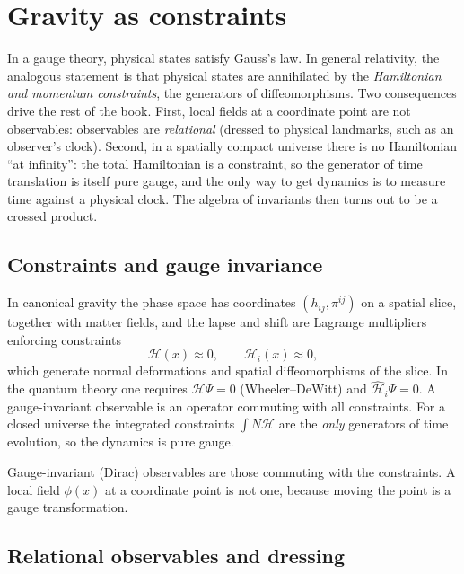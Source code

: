 \chapter{Gravity as constraints}\label{ch:gravity_constraints}

\begin{physmotiv}
In a gauge theory, physical states satisfy Gauss's law. In general relativity, the analogous statement is that physical states are annihilated by the \emph{Hamiltonian and momentum constraints}, the generators of diffeomorphisms. Two consequences drive the rest of the book. First, local fields at a coordinate point are not observables: observables are \emph{relational} (dressed to physical landmarks, such as an observer's clock). Second, in a spatially compact universe there is no Hamiltonian ``at infinity'': the total Hamiltonian is a constraint, so the generator of time translation is itself pure gauge, and the only way to get dynamics is to measure time against a physical clock. The algebra of invariants then turns out to be a crossed product.
\end{physmotiv}

\section{Constraints and gauge invariance}

In canonical gravity the phase space has coordinates $(h_{ij},\pi^{ij})$ on a spatial slice, together with matter fields, and the lapse and shift are Lagrange multipliers enforcing constraints
\begin{equation}
\mathcal H(x)\approx0,\qquad\mathcal H_i(x)\approx0,
\end{equation}
which generate normal deformations and spatial diffeomorphisms of the slice. In the quantum theory one requires $\hat{\mathcal H}\Psi=0$ (Wheeler--DeWitt) and $\hat{\mathcal H}_i\Psi=0$. A gauge-invariant observable is an operator commuting with all constraints. For a closed universe the integrated constraints $\int N\mathcal H$ are the \emph{only} generators of time evolution, so the dynamics is pure gauge.

\begin{keyidea}
Gauge-invariant (Dirac) observables are those commuting with the constraints. A local field $\phi(x)$ at a coordinate point is not one, because moving the point is a gauge transformation.
\end{keyidea}

\section{Relational observables and dressing}

